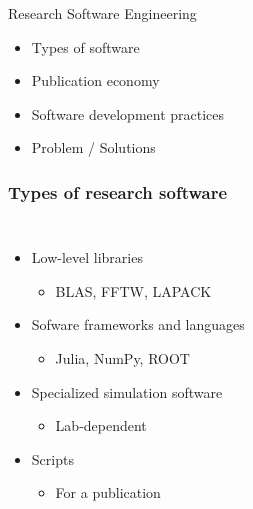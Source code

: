\documentclass{beamer}
\begin{document}
\begin{frame}
\begin{centering}
\Huge Research Software Engineering 
\end{centering}

\Large
\pause
\begin{itemize}
\item Types of software
\pause
\item Publication economy
\pause
\item Software development practices
\pause
\item Problem / Solutions
\end{itemize}

\end{frame}

\begin{frame}
\frametitle{Types of research software}

\begin{columns}
\begin{itemize}
\item Low-level libraries
\begin{itemize}
\item BLAS, FFTW, LAPACK
\end{itemize}
\item Sofware frameworks and languages
\begin{itemize}
\item Julia, NumPy, ROOT
\end{itemize}
\item Specialized simulation software
\begin{itemize}
\item Lab-dependent
\end{itemize}
\item Scripts
\begin{itemize}
\item For a publication
\end{itemize}
\end{itemize}


\end{columns}
\end{frame}
\end{document}
